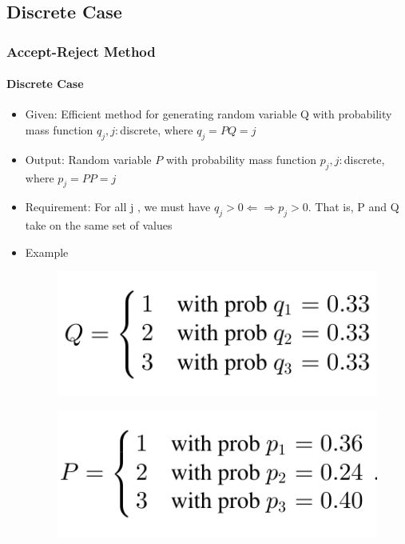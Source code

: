\documentclass{beamer}
\begin{document}
\subsection{Discrete Case}


\begin{frame}
    \frametitle{Accept-Reject Method}
    \framesubtitle{Discrete Case }
	\begin{itemize}
		\item Given: Efficient method for generating random variable Q with probability mass function {$q_j , j:$discrete}, where $q_j = P {Q = j}$
\item Output: Random variable $P$ with probability mass function {$p_j , j:$discrete}, where $p_j = P {P = j}$
\item Requirement: For all j , we must have $q_j > 0 \Longleftarrow\Longrightarrow p_j > 0$. That is, P and Q take on
the same set of values
\item Example
		{
		\begin{figure}
        \begin{center}
		\includegraphics[scale=0.2]{images/accept_reject_discrete_q.jpg}
        \end{center}
		\end{figure}
		} 
		{
		\begin{figure}
        \begin{center}
		\includegraphics[scale=0.2]{images/accept_reject_discrete_p.jpg}
        \end{center}
		\end{figure}
		} 
		  
	\end{itemize}	   
    
\end{frame}
\end{document}
